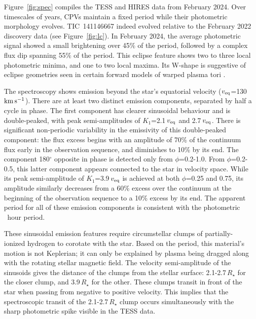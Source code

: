 \documentclass{nature3}
\newcommand{\kms}{\ensuremath{\rm km\,s^{-1}}}
\begin{document}
Figure~\ref{fig:spec} compiles the TESS and HIRES data from February
2024.  Over timescales of years, CPVs maintain a fixed period while
their photometric morphology evolves.  TIC~141146667 indeed evolved
relative to the February 2022 discovery data (see Figure~\ref{fig:lc}).
In February 2024, the average photometric signal showed a small
brightening over 45\% of the period, followed by a complex flux dip
spanning 55\% of the period.  This eclipse feature shows two to three
local photometric minima, and one to two local maxima.  Its W-shape is
suggestive of eclipse geometries seen in certain forward models of warped
plasma tori \cite{Townsend2008}.

The spectroscopy shows emission beyond the star's equatorial velocity
($v_{\rm eq}$=130\,\kms).  There are at least two distinct emission
components, separated by half a cycle in phase.  The first component
has clearer sinusoidal behaviour and is double-peaked, with peak
semi-amplitudes of $K_1$=2.1\,$v_{\rm eq}$ and 2.7\,$v_{\rm eq}$.
There is significant non-periodic variability in the emissivity of
this double-peaked component: the flux excess begins with an amplitude
of 70\% of the continuum flux early in the observation sequence, and
diminishes to 10\% by its end.  The component 180$^\circ$ opposite in
phase is detected only from $\phi$=0.2-1.0.  From $\phi$=0.2-0.5, this
latter component appears connected to the star in velocity space.
While its peak semi-amplitude of $K_1$=3.9\,$v_{\rm eq}$ is achieved
at both $\phi$=0.25 and 0.75, its amplitude similarly decreases from a
60\% excess over the continuum at the beginning of the observation
sequence to a 10\% excess by its end.  The apparent period for all
of these emission components is consistent with the photometric
\periodhr\ hour period.  

These sinusoidal emission features require circumstellar clumps of
partially-ionized hydrogen to corotate with the star.  Based on the
period, this material's motion is not Keplerian; it can only be
explained by plasma being dragged along with the rotating stellar
magnetic field.  The velocity semi-amplitude of the sinusoids gives
the distance of the clumps from the stellar surface:
2.1-2.7\,$R_\star$ for the closer clump, and 3.9\,$R_\star$ for the
other.   These clumps transit in front of the star when passing from
negative to positive velocity.  This implies that the spectroscopic
transit of the 2.1-2.7\,$R_\star$ clump occurs simultaneously with the
sharp photometric spike visible in the TESS data.
\end{document}
